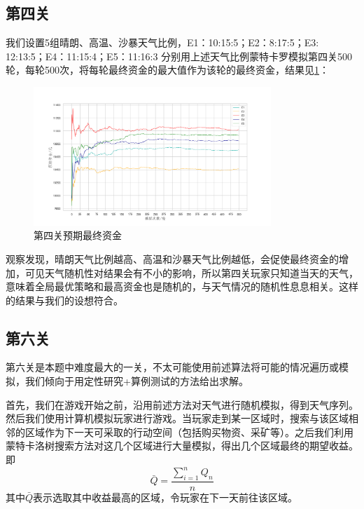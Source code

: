 \documentclass[withoutpre]{cumcmthesis} %
\begin{document}
\subsection{第四关}
我们设置5组晴朗、高温、沙暴天气比例，E1：10:15:5；E2：8:17:5；E3: 12:13:5；E4：11:15:4；E5：11:16:3
分别用上述天气比例蒙特卡罗模拟第四关500轮，每轮500次，将每轮最终资金的最大值作为该轮的最终资金，结果见\cref{fig:analysis4}：
\begin{figure}[H]
    \centering
    \includegraphics[width=0.8\textwidth]{figures/anaysis4.png}
    \caption{第四关预期最终资金}
    \label{fig:analysis4}
\end{figure}
观察发现，晴朗天气比例越高、高温和沙暴天气比例越低，会促使最终资金的增加，可见天气随机性对结果会有不小的影响，所以第四关玩家只知道当天的天气，意味着全局最优策略和最高资金也是随机的，与天气情况的随机性息息相关。这样的结果与我们的设想符合。

\subsection{第六关}
第六关是本题中难度最大的一关，不太可能使用前述算法将可能的情况遍历或模拟，我们倾向于用定性研究+算例测试的方法给出求解。

首先，我们在游戏开始之前，沿用前述方法对天气进行随机模拟，得到天气序列。然后我们使用计算机模拟玩家进行游戏。当玩家走到某一区域时，搜索与该区域相邻的区域作为下一天可采取的行动空间（包括购买物资、采矿等）。之后我们利用蒙特卡洛树搜索方法对这几个区域进行大量模拟，得出几个区域最终的期望收益。即
\begin{equation}
	\bar{Q}=\displaystyle\frac{\sum_{i=1}^{n}Q_n}{n}
\end{equation}
其中$\bar{Q}$表示选取其中收益最高的区域，令玩家在下一天前往该区域。
\begin{thebibliography}{9}%

    

\end{thebibliography}
\end{document}
